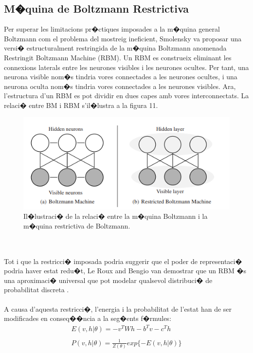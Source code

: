 \documentclass[12pt,a4paper,openright,oneside]{article}
\numberwithin{equation}{section}
\theoremstyle{definition}
\begin{document}
\subsection{M�quina de Boltzmann Restrictiva}
Per superar les limitacions pr�ctiques imposades a la m�quina general Boltzmann com el problema del mostreig ineficient, Smolensky va proposar una versi� estructuralment restringida de la m�quina Boltzmann anomenada Restringit Boltzmann Machine (RBM). Un RBM es construeix eliminant les connexions laterals entre les neurones visibles i les neurones ocultes. Per tant, una neurona visible nom�s tindria vores connectades a les neurones ocultes, i una neurona oculta nom�s tindria vores connectades a les neurones visibles. Ara, l'estructura d'un RBM es pot dividir en dues capes amb vores interconnectats. La relaci� entre BM i RBM s'il�lustra a la figura 11. 
\begin{figure}[h!]
\begin{center}
\includegraphics[width=\textwidth]{boltzmann1}
\caption{Il�lustraci� de la relaci� entre la m�quina Boltzmann i la m�quina restrictiva de Boltzmann.}
\end{center}
\end{figure}
\\\\
Tot i que la restricci� imposada podria suggerir que el poder de representaci� podria haver estat redu�t, Le Roux and Bengio van demostrar que un RBM �s una aproximaci� universal que pot modelar qualsevol distribuci� de probabilitat discreta \cite{leroux}.\\\\
A causa d'aquesta restricci�, l'energia i la probabilitat de l'estat han de ser modificades en conseq��ncia a la seg�ents f�rmules:
\begin{equation}
\begin{array}{l}
E(v,h|\theta) = -v^TWh-b^Tv-c^Th \\\\
P(v,h|\theta) = \frac{1}{Z(\theta)}exp\{-E(v,h|\theta)\}
\end{array}
\end{equation}
\end{document}
